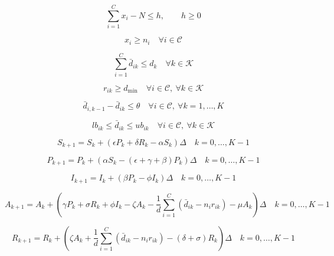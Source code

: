 \documentclass{article}
\begin{document}
\begin{equation}
\sum_{i=1}^{C} x_i - N \le h,\qquad h \ge 0
\tag{27}
\end{equation}

\begin{equation}
x_i \ge n_i
\quad \forall i \in \mathcal C
\tag{28a}
\end{equation}

\begin{equation}
\sum_{i=1}^{C} \bar d_{ik} \le d_k
\quad \forall k \in \mathcal K
\tag{28c}
\end{equation}

\begin{equation}
r_{ik} \ge d_{\min}
\quad \forall i \in \mathcal C,\ \forall k \in \mathcal K
\tag{28d}
\end{equation}

\begin{equation}
\bar d_{i,k-1} - \bar d_{ik} \le \theta
\quad \forall i \in \mathcal C,\ \forall k = 1,\dots,K
\tag{28e}
\end{equation}

\begin{equation}
lb_{ik} \le \bar d_{ik} \le ub_{ik}
\quad \forall i \in \mathcal C,\ \forall k \in \mathcal K
\tag{28f}
\end{equation}

\begin{equation}
S_{k+1} = S_k + (\epsilon P_k + \delta R_k - \alpha S_k)\Delta
\quad k=0,\dots,K-1
\tag{28g}
\end{equation}

\begin{equation}
P_{k+1} = P_k + (\alpha S_k - (\epsilon+\gamma+\beta)P_k)\Delta
\quad k=0,\dots,K-1
\tag{28h}
\end{equation}

\begin{equation}
I_{k+1} = I_k + (\beta P_k - \phi I_k)\Delta
\quad k=0,\dots,K-1
\tag{28i}
\end{equation}

\begin{equation}
A_{k+1} = A_k + \left(
\gamma P_k + \sigma R_k + \phi I_k - \zeta A_k
- \frac{1}{d}\sum_{i=1}^{C}\left(\bar d_{ik} - n_i r_{ik}\right)
- \mu A_k
\right)\Delta
\quad k=0,\dots,K-1
\tag{28j}
\end{equation}

\begin{equation}
R_{k+1} = R_k + \left(
\zeta A_k + \frac{1}{d}\sum_{i=1}^{C}\left(\bar d_{ik} - n_i r_{ik}\right)
- (\delta+\sigma)R_k
\right)\Delta
\quad k=0,\dots,K-1
\tag{28k}
\end{equation}
\end{document}
